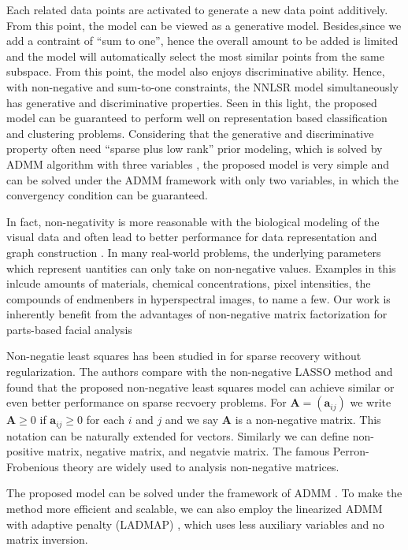 \documentclass[10pt,twocolumn,letterpaper]{article}
\begin{document}
Each related data points are activated to generate a new data point additively. From this point, the model can be viewed as a generative model. Besides,since we add a contraint of ``sum to one'', hence the overall amount to be added is limited and the model will automatically select the most similar points from the same subspace. From this point, the model also enjoys discriminative ability. Hence, with non-negative and sum-to-one constraints, the NNLSR model simultaneously has generative and discriminative properties. Seen in this light, the proposed model can be guaranteed to perform well on representation based classification and clustering problems. Considering that the generative and discriminative property often need ``sparse plus low rank'' prior modeling, which is solved by ADMM algorithm with three variables \cite{nnlrs}, the proposed model is very simple and can be solved under the ADMM framework with only two variables, in which the convergency condition can be guaranteed.


In fact, non-negativity is more reasonable with the biological modeling of the visual data and often lead to better performance for data representation \cite{} and graph construction \cite{}. In many real-world problems, the underlying parameters which represent uantities can only take on non-negative values. Examples in this inlcude amounts of materials, chemical concentrations, pixel intensities, the compounds of endmenbers in hyperspectral images, to name a few. Our work is inherently benefit from the advantages of non-negative matrix factorization for parts-based facial analysis \cite{nmfnature}
 
Non-negatie least squares has been studied in \cite{slawski2013non} for sparse recovery without regularization. The authors compare with the non-negative LASSO method \cite{kim2007interior} and found that the proposed non-negative least squares model can achieve similar or even better performance on sparse recvoery problems. For $\bm{A}=(\bm{a}_{ij})$ we write $\bm{A}\ge0$ if $\bm{a}_{ij}\ge0$ for each $i$ and $j$ and we say $\bm{A}$ is a non-negative matrix. This notation can be naturally extended for vectors. Similarly we can define non-positive matrix, negative matrix, and negatvie matrix. The famous Perron-Frobenious theory are widely used to analysis non-negative matrices.

The proposed model can be solved under the framework of ADMM \cite{admm}. To make the method more efficient and scalable, we can also employ the linearized ADMM with adaptive penalty (LADMAP) \cite{ladmap}, which uses less auxiliary variables and no matrix inversion.
\end{document}
